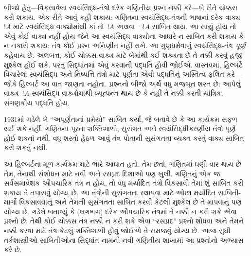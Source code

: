 બીજો હેતુ—વિકસાવેલા સ્વયંસિદ્ધ-તંત્રો દરેક ગણિતીય
પ્રશ્ન નક્કી કરે—બે રીતે ચોક્કસ કરી શકાય. એક રીતે
આવું કહી શકાય: ગણિતના સ્વયંસિદ્ધ-તંત્રની ભાષાનાં
દરેક વાક્ય~$!A$ માટે સ્વયંસિદ્ધ વાક્યોમાંથી
કાં તો~$!A$ અથવા~$\lnot !A$ સાબિત થાય.
આ સાચું હોય તો એવું કોઈ વાક્ય નહીં હોય જેને
આ સ્વયંસિદ્ધ વાક્યોના આધારે ન સાબિત કરી શકાય
કે ન નકારી શકાય; તંત્ર કોઈ પ્રશ્ન અનિર્ણીત નહીં
રાખે. આ ગુણધર્મવાળું સ્વયંસિદ્ધ-તંત્ર
\emph{પૂર્ણ} કહેવાય છે. અલબત્ત, કોઈ ચોક્કસ
વાક્ય માટે બેમાંથી કઈ શક્યતા છે તે નક્કી કરવું
હજી મુશ્કેલ હોઈ શકે. પરંતુ સિદ્ધાંતમાં એવું
કરવાની પદ્ધતિ હોવી જોઈએ. વાસ્તવમાં, હિલ્બર્ટે
વિચારેલાં સ્વયંસિદ્ધ અને નિષ્પત્તિ તંત્રો માટે
પૂર્ણતા એવી પદ્ધતિનું અસ્તિત્વ ફલિત કરે—જોકે
હિલ્બર્ટ આ વાત જાણતા નહોતા. પ્રશ્નનો બીજો
અર્થ વધુ મજબૂત શરત છે: આપેલું વાક્ય~$!A$
સ્વયંસિદ્ધ વાક્યોમાંથી વ્યૂત્પન્ન થાય છે કે નહીં
તે નક્કી કરતી યાંત્રિક, સંગણકીય પદ્ધતિ હોય.

1931માં ગડેલે બે ``અપૂર્ણતાનાં પ્રમેયો'' સાબિત
કર્યાં, જે બતાવે છે કે આ કાર્યક્રમ સફળ થઈ
શકે નહીં. ગણિતના પૂરતા શક્તિશાળી,
સુસંગત અને સ્વયંસિદ્ધીકરણીય તંત્રો પૂર્ણ
હોઈ શકતાં નથી. વધુ શરતો હેઠળ આવું તંત્ર
પોતાની સુસંગતતા વ્યક્ત કરતું વાક્ય સાબિત
કરી શકતું નથી.

આ હિલ્બર્ટના મૂળ કાર્યક્રમ માટે ભારે આઘાત હતો.
તેમ છતાં, ગણિતમાં ઘણી વાર થાય છે તેમ, તેનાથી
સંશોધન માટે નવી અને રસપ્રદ દિશાઓ પણ ખુલી.
ગણિતનું એક જ સર્વસમાવેશક ઔપચારિક તંત્ર ન હોય,
તો વધુ મર્યાદિત તંત્રો વિકસાવી તેમાં શું સાબિત
કરી શકાય તે તપાસવું યોગ્ય છે. આ તંત્રોની
સુસંગતતા સ્થાપવા માટે ઓછા મર્યાદિત સાબિતી-માર્ગો
વિકસાવવાનું અને તેમની સુસંગતતા સાબિત કરવી કેટલી
મુશ્કેલ છે તે માપવાનું પણ યોગ્ય છે. ગડેલે બતાવ્યું
કે (લગભગ) દરેક ઔપચારિક તંત્રમાં તે નક્કી ન
કરી શકે એવા પ્રશ્નો છે; તેથી કોઈ ચોક્કસ તંત્ર
નક્કી ન કરી શકે એવા ``રસપ્રદ'' પ્રશ્નો શોધવા
અને તેમને નક્કી કરવા માટે તંત્ર કેટલું શક્તિશાળી
હોવું જોઈએ તે સમજવું યોગ્ય છે. આજ સુધી
તર્કશાસ્ત્રીઓ સાબિતીઓના સિદ્ધાંત નામની નવી
ગણિતીય શાખામાં આ પ્રશ્નોનો અભ્યાસ કરે છે.
\endgroup


\begingroup
\makeatletter{}\makeatother



